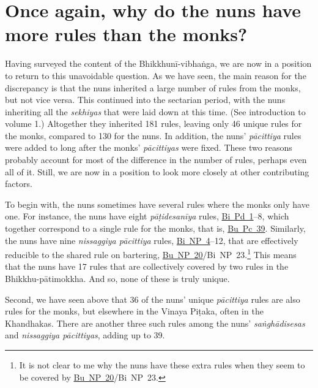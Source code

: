 \documentclass[12pt,openany]{book}%
\begin{document}
\section*{Once again, why do the nuns have more rules than the monks?}

Having surveyed the content of the \textsanskrit{Bhikkhunī}-\textsanskrit{vibhaṅga}, we are now in a position to return to this unavoidable question. As we have seen, the main reason for the discrepancy is that the nuns inherited a large number of rules from the monks, but not vice versa. This continued into the sectarian period, with the nuns inheriting all the \textit{sekhiyas} that were laid down at this time. (See introduction to volume 1.) Altogether they inherited 181 rules, leaving only 46 unique rules for the monks, compared to 130 for the nuns. In addition, the nuns’ \textit{\textsanskrit{pācittiya}} rules were added to long after the monks’ \textit{\textsanskrit{pācittiyas}} were fixed. These two reasons probably account for most of the difference in the number of rules, perhaps even all of it. Still, we are now in a position to look more closely at other contributing factors.

To begin with, the nuns sometimes have several rules where the monks only have one. For instance, the nuns have eight \textit{\textsanskrit{pāṭidesanīya}} rules, \href{https://suttacentral.net/pli-tv-bi-vb-pd1/en/brahmali\#1.2.9.1}{Bi~Pd~1}–8, which together correspond to a single rule for the monks, that is, \href{https://suttacentral.net/pli-tv-bu-vb-pc39/en/brahmali\#2.10.1}{Bu~Pc~39}. Similarly, the nuns have nine \textit{nissaggiya \textsanskrit{pācittiya}} rules, \href{https://suttacentral.net/pli-tv-bi-vb-np4/en/brahmali\#1.27.1}{Bi~NP~4}–12, that are effectively reducible to the shared rule on bartering, \href{https://suttacentral.net/pli-tv-bu-vb-np20/en/brahmali\#1.35.1}{Bu~NP~20}/Bi NP 23.\footnote{It is not clear to me why the nuns have these extra rules when they seem to be covered by \href{https://suttacentral.net/pli-tv-bu-vb-np20/en/brahmali\#1.35.1}{Bu~NP~20}/Bi NP 23. } This means that the nuns have 17 rules that are collectively covered by two rules in the Bhikkhu-\textsanskrit{pātimokkha}. And so, none of these is truly unique.

Second, we have seen above that 36 of the nuns’ unique \textit{\textsanskrit{pācittiya}} rules are also rules for the monks, but elsewhere in the Vinaya \textsanskrit{Piṭaka}, often in the Khandhakas. There are another three such rules among the nuns’ \textit{\textsanskrit{saṅghādisesas}} and \textit{nissaggiya \textsanskrit{pācittiyas}}, adding up to 39.
\end{document}
